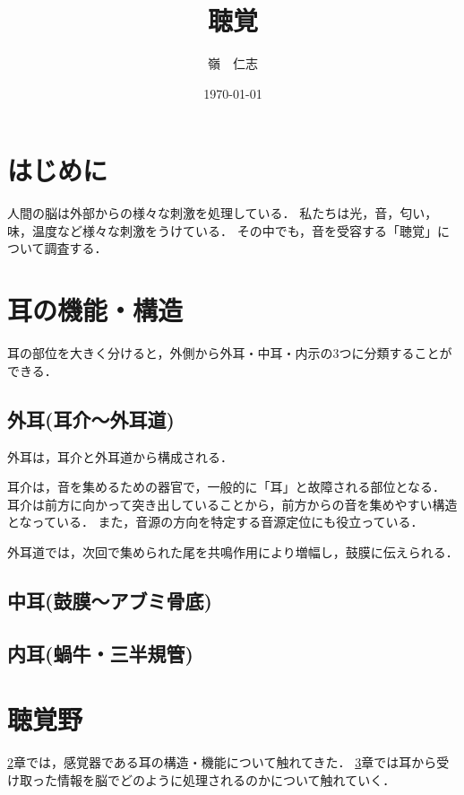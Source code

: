 \documentclass[12pt]{jarticle}
\title{聴覚}
\author{嶺　仁志}
\date{\today}
\begin{document}
\maketitle
\section{はじめに}
\label{intro}
人間の脳は外部からの様々な刺激を処理している．
私たちは光，音，匂い，味，温度など様々な刺激をうけている．
その中でも，音を受容する「聴覚」について調査する．\cite{構造}
\section{耳の機能・構造}
\label{ear}
耳の部位を大きく分けると，外側から外耳・中耳・内示の3つに分類することができる．
\subsection{外耳(耳介～外耳道)}
\label{xxx}
外耳は，耳介と外耳道から構成される．

耳介は，音を集めるための器官で，一般的に「耳」と故障される部位となる．
耳介は前方に向かって突き出していることから，前方からの音を集めやすい構造となっている．
また，音源の方向を特定する音源定位にも役立っている．

外耳道では，次回で集められた尾を共鳴作用により増幅し，鼓膜に伝えられる．
\subsection{中耳(鼓膜～アブミ骨底)}
\label{yyy}

\subsection{内耳(蝸牛・三半規管)}
\label{zzz}
\section{聴覚野}
\label{聴覚野}
\ref{ear}章では，感覚器である耳の構造・機能について触れてきた．
\ref{聴覚野}章では耳から受け取った情報を脳でどのように処理されるのかについて触れていく．\cite{聴覚野}



\end{document}
